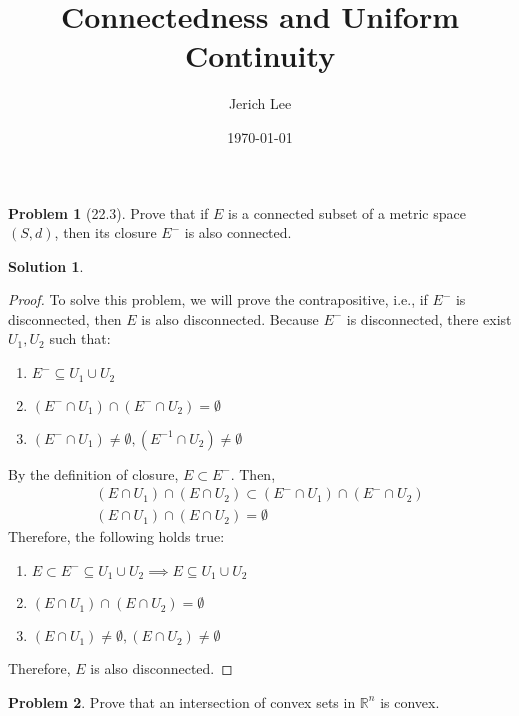 \documentclass[12pt]{article}
\title{Connectedness and Uniform Continuity}
\author{Jerich Lee}
\date{\today}
\theoremstyle{definition} %
\newtheorem{solution}{Solution}
\newtheorem{problem}{Problem}
\theoremstyle{plain} %
\begin{document}
\maketitle

\begin{problem}[22.3]
Prove that if $E$ is a connected subset of a metric space $(S, d)$, then its closure $E^-$ is also connected.
\end{problem}
\begin{solution}
    \begin{proof}
        To solve this problem, we will prove the contrapositive, i.e., if $E^{-}$ is disconnected, then $E$ is also disconnected. Because $E^{-}$ is disconnected, there exist $U_1, U_2$ such that:
    \begin{enumerate}
        \item $E^{-}\subseteq U_1 \cup U_2$ 
        \item $(E^{-}\cap U_1)\cap (E^{-}\cap U_2)=\emptyset$
        \item $(E^{-}\cap U_1) \neq \emptyset, (E^{-1}\cap U_{2})\neq \emptyset$   
    \end{enumerate}  By the definition of closure, $E \subset E^{-}$. Then, 
    \begin{align}
        (E\cap U_1)\cap (E\cap U_2)\subset (E^{-}\cap U_1)\cap (E^{-}\cap U_2) \\[10pt] 
        (E\cap U_1)\cap (E\cap U_2)=\emptyset 
    \end{align}  Therefore, the following holds true:
    \begin{enumerate}
    \item $E \subset E^{-} \subseteq U_1 \cup U_2\implies E \subseteq U_1 \cup U_2$  
    \item $(E\cap U_1)\cap (E\cap U_2)=\emptyset$
    \item $(E\cap U_1)\neq \emptyset, (E\cap U_{2})\neq \emptyset$   
    \end{enumerate}
    Therefore, $E$ is also disconnected.
\end{proof}
\end{solution}
\begin{problem}
Prove that an intersection of convex sets in $\mathbb{R}^n$ is convex.
\end{problem}
\end{document}
